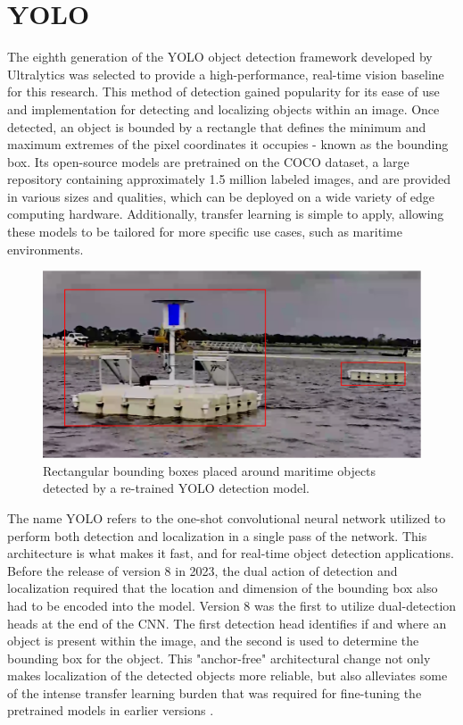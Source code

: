 \documentclass[../main.tex]{subfiles}
\begin{document}
\section{YOLO}
\label{yolo}
The eighth generation of the \ac{YOLO} object detection framework developed by Ultralytics was selected to provide a high-performance, real-time vision baseline for this research. 
This method of detection gained popularity for its ease of use and implementation for detecting and localizing objects within an image.
Once detected, an object is bounded by a rectangle that defines the minimum and maximum extremes of the pixel coordinates it occupies - known as the bounding box.
Its open-source models are pretrained on the COCO dataset, a large repository containing approximately 1.5 million labeled images, and are provided in various sizes and qualities, which can be deployed on a wide variety of edge computing hardware.
Additionally, transfer learning is simple to apply, allowing these models to be tailored for more specific use cases, such as maritime environments.

\begin{figure}
    \centering
    \includegraphics[width=0.5\linewidth]{Images/YOLO_ex1.png}
    \caption{Rectangular bounding boxes placed around maritime objects detected by a re-trained YOLO detection model.}
    \label{fig:YOLO_tower}
\end{figure}

The name YOLO refers to the one-shot convolutional neural network utilized to perform both detection and localization in a single pass of the network.
This architecture is what makes it fast, and for real-time object detection applications. 
Before the release of version 8 in 2023, the dual action of detection and localization required that the location and dimension of the bounding box also had to be encoded into the model.
Version 8 was the first to utilize dual-detection heads at the end of the CNN.
The first detection head identifies if and where an object is present within the image, and the second is used to determine the bounding box for the object.
This "anchor-free" architectural change not only makes localization of the detected objects more reliable, but also alleviates some of the intense transfer learning burden that was required for fine-tuning the pretrained models in earlier versions \cite{ultralytics}.
\end{document}
